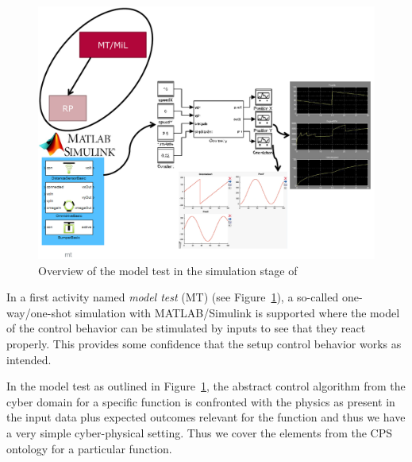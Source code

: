 \begin{figure}[!htb]
\centering
\includegraphics[scale=0.33]{figures/mt.pdf}
\caption{Overview of the model test in the simulation stage of \cite{Broekman&Notenboom2003}}
\label{fig:mt}
\end{figure}

%
In a first activity named \emph{model test} (MT) (see Figure~\ref{fig:mt}), a so-called one-way/one-shot simulation with MATLAB/Simulink is supported where the model of the control behavior can be stimulated by inputs to see that they react properly. This provides some confidence that the setup control behavior works as intended.

%
In the model test as outlined in Figure~\ref{fig:mt}, the abstract control algorithm from the cyber domain for a specific function is confronted with the physics as present in the input data plus expected outcomes relevant for the function and thus we have a very simple cyber-physical setting. 
%
Thus we cover the elements \CPSCyberPart from the CPS ontology for a particular function.


